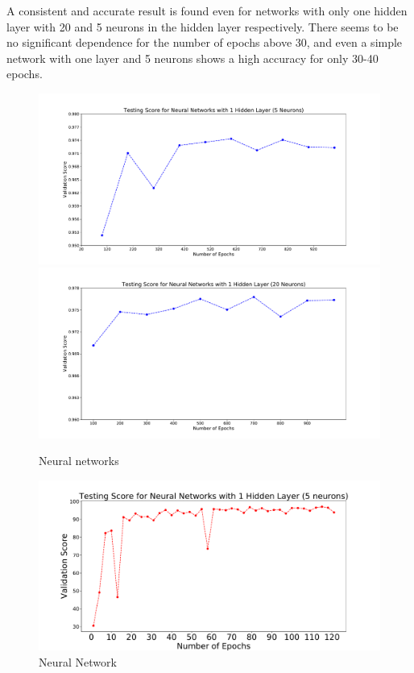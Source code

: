 A consistent and accurate result is found even for networks with only one hidden layer with 20 and 5 neurons in the hidden layer respectively. There seems to be no significant dependence for the number of epochs above 30, and even a simple network with one layer and 5 neurons shows a high accuracy for only 30-40 epochs.\\


\begin{figure}[h]
\includegraphics[width=\twopicsp\textwidth]{epochsvsscore1_10seeds.pdf}
\includegraphics[width=\twopicsp\textwidth]{epochsvsscore2_10seeds.pdf}
\caption{
Neural networks
}
\label{fig:Maps_data}
\end{figure}

\begin{figure}[h]
\includegraphics[width=\onepic\textwidth]{epochsvsscore1_10seeds_1layer_5.pdf}
\caption{
Neural Network
}
\label{fig:Maps_data}
\end{figure}	



